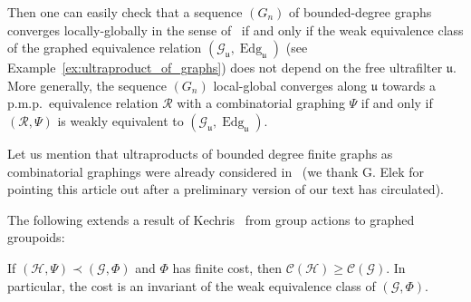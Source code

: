 \documentclass[AHL,Unicode,longabstracts,published]{cedram}
\newcommand{\RR}{\mathcal{R}}
\newcommand{\cost}{\mathcal{C}}
\newcommand{\ch}{\mathcal{H}}
\newcommand{\cg}{\mathcal{G}}
\DeclareMathOperator{\Edg}{Edg}
\newcommand{\ul}{\mathfrak{u}}
\newcommand{\pmp}{p.m.p.\ }
\newcommand*{\MK}{\mkern 2mu}
\begin{document}
\begin{rema}
Then one can easily check that a sequence $(G_n)$ of bounded-degree graphs converges locally-globally in the sense of~\cite{HatLovSze} if and only if the weak equivalence class of the graphed equivalence relation $(\cg_\ul,\Edg_\ul)$ (see Example~\ref{ex:ultraproduct_of_graphs}) does not depend on the free ultrafilter $\ul$. More generally, the sequence $(G_n)$ local-global converges along $\ul$ towards a \pmp equivalence relation $\RR$ with a combinatorial graphing $\Psi$ if and only if $(\RR,\Psi)$ is weakly equivalent to $(\cg_\ul,\Edg_\ul)$.

Let us mention that ultraproducts of bounded degree finite graphs as combinatorial graphings were already considered in~\cite{Elek-2010-param-test} (we thank G. Elek for pointing this article out after a preliminary version of our text has circulated).
\end{rema}



The following extends a result of Kechris~\cite[end of Section~10$\MK$(C)]{Kechris-Global-aspects-2010} from group actions to graphed groupoids:
\begin{theo}
If $(\ch,\Psi) \prec (\cg, \Phi)$ and $\Phi$ has finite cost, then $\cost (\ch) \geq \cost(\cg)$. In particular, the cost is an invariant of the weak equivalence class of $(\cg, \Phi)$.
\end{theo}
\end{document}
